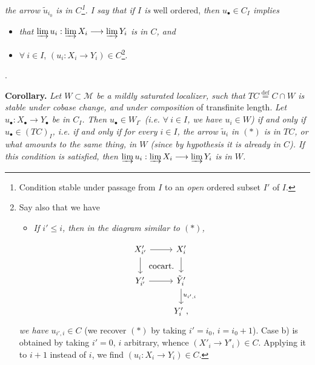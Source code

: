 \textit{the arrow $\tilde{u}_{i_0}$ is in $C$\footnote{Condition stable under passage from $I$ to an \textit{open} ordered subset $I'$ of $I$.}. I say that if $I$ is} well ordered, \textit{then $u_\bullet \in C_I$ implies}
\begin{itemize}[leftmargin=2.5em]
\item[a)] \textit{that $\varinjlim u_i : \varinjlim X_i \longrightarrow \varinjlim Y_i$ is in $C$, and}
\item[b)] $\forall\ i \in I$, $(u_i : X_i \longrightarrow Y_i) \in C$\footnote{Say also that we have
\begin{itemize}[leftmargin=2em]
\item[b$'$)] \textit{If $i' \leq i$, then in the diagram similar to $(*)$,}
\end{itemize}
\[
\begin{tikzcd}[ampersand replacement=\&]
X'_{i'} \arrow[r] \arrow[d] \arrow[dr, phantom, "\text{cocart.}"] \& X'_i \arrow[d] \\
Y'_{i'} \arrow[r] \& \tilde{Y}'_i \arrow[d, "u_{i',i}"] \\
\& Y'_i\ ,
\end{tikzcd}
\]
\textit{we have} $u_{i',i} \in C$ (we recover $(*)$ by taking $i' = i_0$, $i = i_0 + 1$). Case b) is obtained by taking $i' = 0$, $i$ arbitrary, whence $(X'_i \longrightarrow Y'_i) \in C$. Applying it to $i+1$ instead of $i$, we find $(u_i : X_i \longrightarrow Y_i) \in C$.}.
\end{itemize}

. %

\textbf{Corollary.} \textit{Let $W \subset \mathcal{M}$ be a mildly saturated localizer, such that $TC \overset{\text{def}}{=} C \cap W$ is stable under cobase change, and under composition} of transfinite length. \textit{Let $u_\bullet : X_\bullet \longrightarrow Y_\bullet$ be in $C_I$. Then $u_\bullet \in W_{I^{\circ}}$ (i.e. $\forall\ i \in I$, we have $u_i \in W$) if and only if $u_\bullet \in (TC)_I$, i.e. if and only if for every $i \in I$, the arrow $\tilde{u}_i$ in $(*)$ is in $TC$, or what}
\textit{amounts to the same thing, in $W$ (since by hypothesis it is already in $C$). If this condition is satisfied, then $\varinjlim u_i : \varinjlim X_i \longrightarrow \varinjlim Y_i$ is in $W$.}


